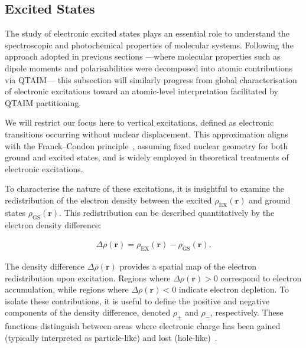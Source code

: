 \subsection{Excited States}

The study of electronic excited states plays an essential role to
understand the spectroscopic and photochemical properties of molecular
systems. Following the approach adopted in previous sections ---where molecular
properties such as dipole moments and polarisabilities were decomposed into
atomic contributions via QTAIM--- this subsection will similarly progress from
global characterisation of electronic excitations toward an atomic-level
interpretation facilitated by QTAIM partitioning.

We will restrict our focus here to vertical excitations, defined as electronic
transitions occurring without nuclear displacement. This approximation aligns
with the Franck–Condon principle~\cite{Franck1926, Condon1926}, assuming fixed
nuclear geometry for both ground and excited states, and is widely employed in
theoretical treatments of electronic excitations.

\newpage
To characterise the nature of these excitations, it is insightful to examine
the redistribution of the electron density between the excited
$\rho_{\mathrm{EX}}(\mathbf{r})$ and ground states
$\rho_{\mathrm{GS}}(\mathbf{r})$. This redistribution can be described
quantitatively by the electron density difference:

\begin{align}
  \Delta\rho (\mathbf{r}) = \rho_{\mathrm{EX}}(\mathbf{r}) - \rho_{\mathrm{GS}}(\mathbf{r}).
\end{align}

The density difference $\Delta\rho(\mathbf{r})$ provides a spatial map of the
electron redistribution upon excitation. Regions where $\Delta\rho(\mathbf{r})
> 0$ correspond to electron accumulation, while regions where
$\Delta\rho(\mathbf{r}) < 0$ indicate electron depletion. To isolate these
contributions, it is useful to define the positive and negative components of
the density difference, denoted $\rho_+$ and $\rho_-$, respectively. These
functions distinguish between areas where electronic charge has been gained
(typically interpreted as particle-like) and lost
(hole-like)~\cite{Gatti2022,Herbert2023}.

